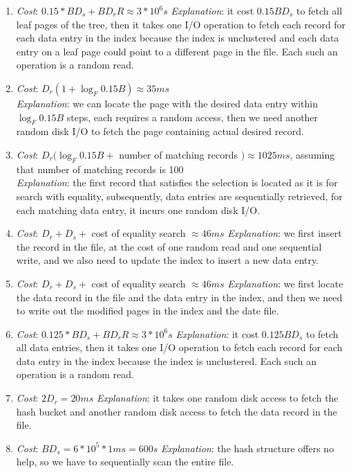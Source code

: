 \documentclass[10pt]{article}
\begin{document}
\begin{enumerate}
\begin{enumerate}
\item \emph{Cost}: $0.15 * BD_s + BD_rR \approx 3 * 10^6s$
  \emph{Explanation}: it cost $0.15BD_s$ to fetch all leaf pages of the
  tree, then it takes one I/O operation to fetch each record for each
  data entry in the index because the index is unclustered and each
  data entry on a leaf page could point to a different page in the
  file. Each such an operation is a random read.
\item \emph{Cost}: $D_r(1+\log_F 0.15B) \approx 35ms$\\
  \emph{Explanation}: we can locate the page with the desired data
  entry within $\log_F 0.15B$ steps, each requires a random access,
  then we need another random disk I/O to 
  fetch the page containing actual desired record.
\item \emph{Cost}: $D_r(\log_F 0.15B + $ number of matching
  records $) \approx 1025ms$, assuming that number of matching
  records is 100\\
  \emph{Explanation}: the first record that satisfies the selection is
  located as it is for search with equality, subsequently, data
  entries are sequentially retrieved, for each matching data entry, it
  incurs one random disk I/O.
\item \emph{Cost}: $D_r + D_s + $ cost of equality search $\approx 46ms$
  \emph{Explanation}: we first insert the record in the file, at the
  cost of one random read and one sequential write, and we also need
  to update the index to insert a new data entry.
\item \emph{Cost}: $D_r + D_s + $ cost of equality search $\approx 46ms$
  \emph{Explanation}: we first locate the data record in the file and
  the data entry in the index, and then we need to write out the
  modified pages in the index and the date file.

\item \emph{Cost}: $0.125 * BD_s + BD_rR \approx 3 * 10^6s$
  \emph{Explanation}: it cost $0.125BD_s$ to fetch all data entries,
  then it takes one I/O operation to fetch each record for each
  data entry in the index because the index is unclustered. Each such
  an operation is a random read.

\item \emph{Cost}: $2D_r = 20ms$
  \emph{Explanation}: it takes one random disk access to fetch the
  hash bucket and another random disk access to fetch the data record
  in the file.

\item \emph{Cost}: $BD_s = 6 * 10^5 * 1ms = 600s$
  \emph{Explanation}: the hash structure offers no help, so we have to
  sequentially scan the entire file.


\end{enumerate}
\end{enumerate}
\end{document}
